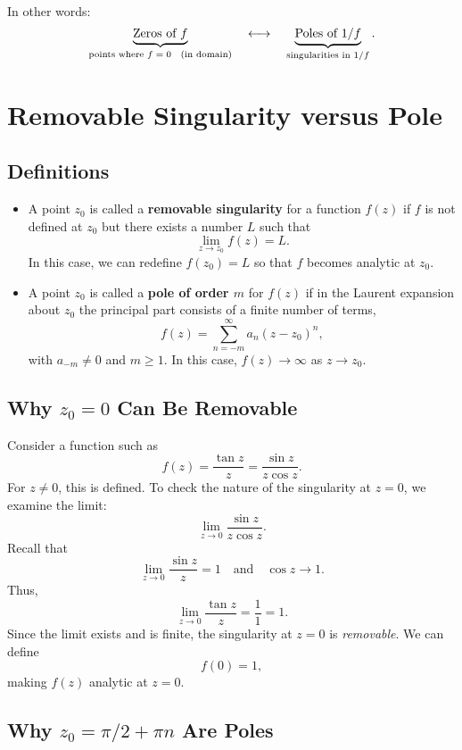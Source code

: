 \documentclass[12pt]{article}
\theoremstyle{definition} %
\theoremstyle{plain} %
\begin{document}
In other words:
\[
\underbrace{\text{Zeros of $f$}}_{\text{points where $f=0$ \; (in domain)}} 
\quad\longleftrightarrow\quad
\underbrace{\text{Poles of $1/f$}}_{\text{singularities in $1/f$}}.
\]


\section*{Removable Singularity versus Pole}

\subsection*{Definitions}
\begin{itemize}
  \item A point \(z_0\) is called a \textbf{removable singularity} for a function \(f(z)\) if \(f\) is not defined at \(z_0\) but there exists a number \(L\) such that
  \[
  \lim_{z\to z_0} f(z) = L.
  \]
  In this case, we can redefine \(f(z_0)=L\) so that \(f\) becomes analytic at \(z_0\).

  \item A point \(z_0\) is called a \textbf{pole of order \(m\)} for \(f(z)\) if in the Laurent expansion about \(z_0\) the principal part consists of a finite number of terms,
  \[
  f(z) = \sum_{n=-m}^{\infty} a_n (z-z_0)^n,
  \]
  with \(a_{-m}\neq 0\) and \(m\ge1\). In this case, \(f(z)\to\infty\) as \(z\to z_0\).
\end{itemize}

\subsection*{Why \(z_0=0\) Can Be Removable}

Consider a function such as
\[
f(z) = \frac{\tan z}{z} = \frac{\sin z}{z\cos z}.
\]
For \(z\neq0\), this is defined. To check the nature of the singularity at \(z=0\), we examine the limit:
\[
\lim_{z\to0} \frac{\sin z}{z\cos z}.
\]
Recall that
\[
\lim_{z\to0}\frac{\sin z}{z} = 1 \quad \text{and} \quad \cos z \to 1.
\]
Thus,
\[
\lim_{z\to0} \frac{\tan z}{z} = \frac{1}{1} = 1.
\]
Since the limit exists and is finite, the singularity at \(z=0\) is \emph{removable}. We can define
\[
f(0)=1,
\]
making \(f(z)\) analytic at \(z=0\).

\subsection*{Why \(z_0=\pi/2+\pi n\) Are Poles}
\end{document}
